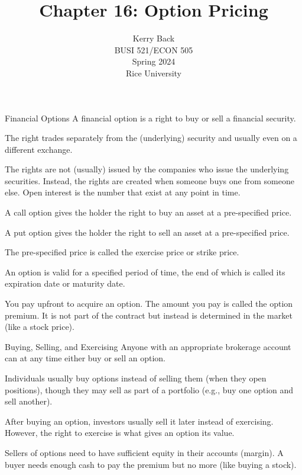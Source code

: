 \documentclass[10pt]{beamer}
\title{Chapter 16: Option Pricing}
\date{}
\author{Kerry Back\\ 
BUSI 521/ECON 505\\
Spring 2024\\
Rice University}
\begin{document}
\maketitle



\begin{frame}{Financial Options}
    A financial option is a right to buy or sell  a financial security.
    
    The right trades separately from the (underlying) security and usually even on a different exchange.
    
    The rights are not (usually) issued by the companies who issue the underlying securities.  Instead, the rights are created when someone buys one from someone else.  Open interest is the number that exist at any point in time.
    
\end{frame}
\begin{frame}
A \alert{call} option gives the holder the right to \alert{buy} an asset at a pre-specified price.

A \alert{put} option gives the holder the right to \alert{sell} an asset at a pre-specified price.

The pre-specified price is called the exercise price or strike price.  

An option is valid for a specified period of time, the end of which is called its expiration date or maturity date.

You pay upfront to acquire an option.  The amount you pay is called the option premium.  It is not part of the contract but instead is determined in the market (like a stock price).
\end{frame}

\begin{frame}{Buying, Selling, and Exercising}
    Anyone with an appropriate brokerage account can at any time either buy or sell an option.
    
    Individuals usually buy options instead of selling them (when they open positions), though they may sell as part of a portfolio (e.g., buy one option and sell another).
    
    After buying an option, investors usually sell it later instead of exercising.  However, the right to exercise is what gives an option its value.
    
    Sellers of options need to have sufficient equity in their accounts (margin).  A buyer needs enough cash to pay the premium but no more (like buying a stock).
\end{frame}
\end{document}
